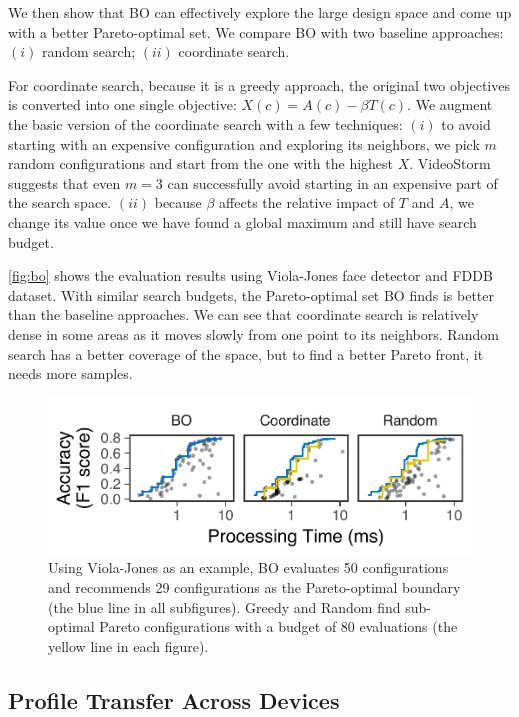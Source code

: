 We then show that BO can effectively explore the large design space and come up
with a better Pareto-optimal set. We compare BO with two baseline approaches:
$(i)$ random search; $(ii)$ coordinate search.

For coordinate search, because it is a greedy approach, the original two
objectives is converted into one single objective: $X(c) = A(c) - \beta
T(c)$. We augment the basic version of the coordinate search with a few
techniques: $(i)$ to avoid starting with an expensive configuration and
exploring its neighbors, we pick $m$ random configurations and start from the
one with the highest $X$. VideoStorm~\cite{zhang2017live} suggests that even
$m = 3$ can successfully avoid starting in an expensive part of the search
space. $(ii)$ because $\beta$ affects the relative impact of $T$ and $A$, we
change its value once we have found a global maximum and still have search
budget.

\autoref{fig:bo} shows the evaluation results using Viola-Jones face detector
and FDDB dataset. With similar search budgets, the Pareto-optimal set BO finds
is better than the baseline approaches. We can see that coordinate search is
relatively dense in some areas as it moves slowly from one point to its
neighbors. Random search has a better coverage of the space, but to find a
better Pareto front, it needs more samples.

\begin{figure}
  \centering
  \includegraphics[width=0.85\columnwidth]{figures/bo-eval.pdf}
  \caption{Using Viola-Jones as an example, BO evaluates 50 configurations and
    recommends 29 configurations as the Pareto-optimal boundary (the blue line
    in all subfigures). Greedy and Random find sub-optimal Pareto configurations
    with a budget of 80 evaluations (the yellow line in each figure).}
  \label{fig:bo}
\end{figure}

\subsection{Profile Transfer Across Devices}
\label{sec:performance-transfer}

